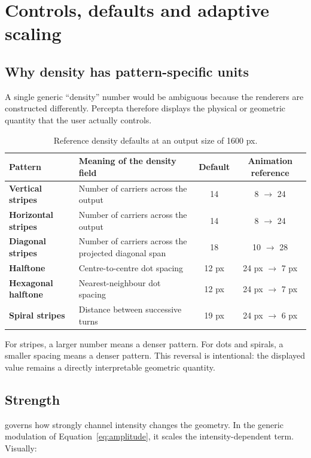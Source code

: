 \section{Controls, defaults and adaptive scaling}

\subsection{Why density has pattern-specific units}

A single generic ``density'' number would be ambiguous because the renderers are constructed differently. Percepta therefore displays the physical or geometric quantity that the user actually controls.

\begin{table}[H]
\centering
\caption{Reference density defaults at an output size of 1600 px.}
\label{tab:defaults}
\begin{tabularx}{\textwidth}{>{\bfseries}l >{\raggedright\arraybackslash}X c c}
\toprule
Pattern & Meaning of the density field & Default & Animation reference \\
\midrule
Vertical stripes & Number of carriers across the output & 14 & 8 $\rightarrow$ 24 \\
Horizontal stripes & Number of carriers across the output & 14 & 8 $\rightarrow$ 24 \\
Diagonal stripes & Number of carriers across the projected diagonal span & 18 & 10 $\rightarrow$ 28 \\
Halftone & Centre-to-centre dot spacing & 12 px & 24 px $\rightarrow$ 7 px \\
Hexagonal halftone & Nearest-neighbour dot spacing & 12 px & 24 px $\rightarrow$ 7 px \\
Spiral stripes & Distance between successive turns & 19 px & 24 px $\rightarrow$ 6 px \\
\bottomrule
\end{tabularx}
\end{table}

For stripes, a larger number means a denser pattern. For dots and spirals, a smaller spacing means a denser pattern. This reversal is intentional: the displayed value remains a directly interpretable geometric quantity.

\subsection{Strength}

 governs how strongly channel intensity changes the geometry. In the generic modulation of Equation~\eqref{eq:amplitude}, it scales the intensity-dependent term. Visually:

